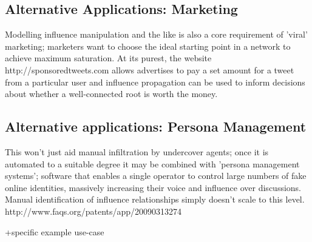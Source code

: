 \subsection{Alternative Applications: Marketing}
Modelling influence manipulation and the like is also a core requirement of
'viral' marketing; marketers want to choose the ideal starting point in a
network to achieve maximum saturation. At its purest, the website
http://sponsoredtweets.com allows advertises to pay a set amount for a tweet
from a particular user and influence propagation can be used to inform decisions
about whether a well-connected root is worth the money. 

\subsection{Alternative applications: Persona Management}
This won't just aid manual infiltration by undercover agents; once it is
automated to a suitable degree it may be combined with 'persona management
systems'; software that enables a single operator to control large numbers of
fake online identities, massively increasing their voice and influence over
discussions. Manual identification of influence relationships simply doesn't
scale to this level.
http://www.faqs.org/patents/app/20090313274

+specific example use-case
% 

